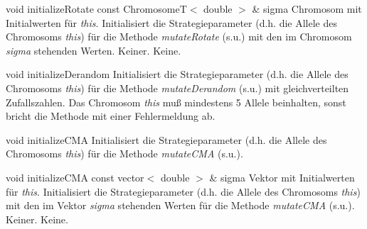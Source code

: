 \documentclass{report}
\begin{document}
\newpage

\setNormalInstance
\printMethodWithOneParam
{void}
{initializeRotate}
{const ChromosomeT$<$ double $>$ \&}
{sigma}
{Chromosom mit Initialwerten f\"ur {\em this}.}
{Initialisiert die Strategieparameter (d.h. die Allele des
 Chromosoms {\em this}) f\"ur die 
 Methode {\em mutateRotate} (s.u.) mit den im Chromosom {\em sigma}
 stehenden Werten.}
{Keiner.}
{Keine.}

\vspace{4ex}

\setNormalInstance
\setCorrectWidthThree{8pt}
\printMethodWithParamsSaved
{void}
{}
{initializeDerandom}
{Initialisiert die Strategieparameter (d.h. die Allele des
 Chromosoms {\em this}) f\"ur die Methode {\em mutateDerandom} (s.u.)
 mit gleichverteilten Zufallszahlen.}
{Das Chromosom {\em this} mu{\ss} mindestens 5 Allele beinhalten, sonst
 bricht die Methode mit einer Fehlermeldung ab.}
\setCorrectWidthThree{4pt}

\vspace{4ex}

\setNormalInstance
\setCorrectWidthThree{8pt}
\printMethodWithParamsSaved
{void}
{}
{initializeCMA}
{Initialisiert die Strategieparameter (d.h. die Allele des Chromosoms
 {\em this}) f\"ur die Methode {\em mutateCMA} (s.u.).}
{}
\setCorrectWidthThree{4pt}

\newpage

\setNormalInstance
\printMethodWithOneParam
{void}
{initializeCMA}
{const vector$<$ double $>$ \&}
{sigma}
{Vektor mit Initialwerten f\"ur {\em this}.}
{Initialisiert die Strategieparameter (d.h. die Allele des Chromosoms
 {\em this}) mit den im Vektor {\em sigma} stehenden Werten f\"ur
 die Methode {\em mutateCMA} (s.u.).}
{Keiner.}
{Keine.}
\end{document}

